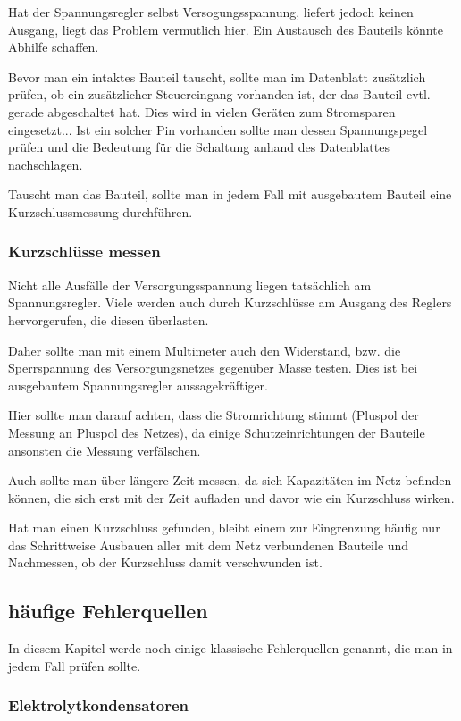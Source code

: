 Hat der Spannungsregler selbst Versogungsspannung, liefert jedoch keinen Ausgang, liegt das Problem vermutlich hier. Ein Austausch des Bauteils könnte Abhilfe schaffen.

Bevor man ein intaktes Bauteil tauscht, sollte man im Datenblatt zusätzlich prüfen, ob ein zusätzlicher Steuereingang vorhanden ist, der das Bauteil evtl. gerade abgeschaltet hat.
Dies wird in vielen Geräten zum Stromsparen eingesetzt...
Ist ein solcher Pin vorhanden sollte man dessen Spannungspegel prüfen und die Bedeutung für die Schaltung anhand des Datenblattes nachschlagen.

Tauscht man das Bauteil, sollte man in jedem Fall mit ausgebautem Bauteil eine Kurzschlussmessung durchführen.

\subsubsection{Kurzschlüsse messen}

Nicht alle Ausfälle der Versorgungsspannung liegen tatsächlich am Spannungsregler.
Viele werden auch durch Kurzschlüsse am Ausgang des Reglers hervorgerufen, die diesen überlasten.

Daher sollte man mit einem Multimeter auch den Widerstand, bzw. die Sperrspannung des Versorgungsnetzes gegenüber Masse testen. Dies ist bei ausgebautem Spannungsregler aussagekräftiger.

Hier sollte man darauf achten, dass die Stromrichtung stimmt (Pluspol der Messung an Pluspol des Netzes), da einige Schutzeinrichtungen der Bauteile ansonsten die Messung verfälschen.

Auch sollte man über längere Zeit messen, da sich Kapazitäten im Netz befinden können, die sich erst mit der Zeit aufladen und davor wie ein Kurzschluss wirken.

Hat man einen Kurzschluss gefunden, bleibt einem zur Eingrenzung häufig nur das Schrittweise Ausbauen aller mit dem Netz verbundenen Bauteile und Nachmessen, ob der Kurzschluss damit verschwunden ist.

\subsection{häufige Fehlerquellen}

In diesem Kapitel werde noch einige klassische Fehlerquellen genannt, die man in jedem Fall prüfen sollte.

\subsubsection{Elektrolytkondensatoren}

